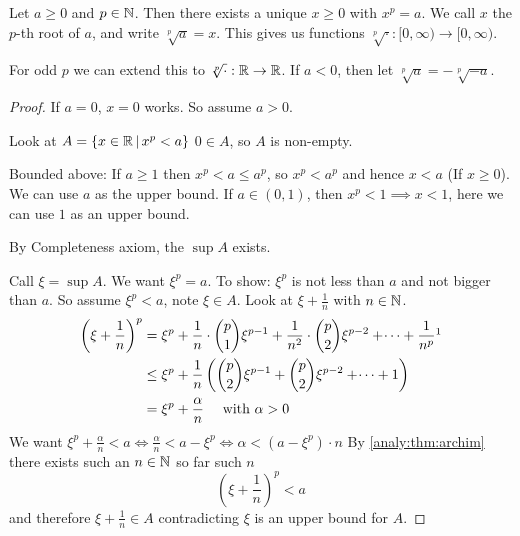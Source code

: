 \documentclass[10pt, a4paper]{article}
\begin{document}
\begin{theorem}
    Let $a \geq 0$ and $p \in \mathbb{N}$.
    Then there exists a unique $x \geq 0$ with $x ^ p = a$.
    We call $x$ the $p$-th root of $a$,
    and write $\sqrt[p]{a} = x$.
    This gives us functions $\sqrt[p]{\cdot} : [0, \infty) \rightarrow [0, \infty)$.

    For odd $p$ we can extend this to $\sqrt[p]{\cdot} : \mathbb{R} \rightarrow \mathbb{R}$.
    If $a < 0$, then let $\sqrt[p]{a} = -\sqrt[p]{-a}$.
    \begin{proof}
        If $a = 0$, $x = 0$ works.
        So assume $a > 0$.

        Look at $A = \{x \in \mathbb{R}\,|\, x ^ p < a\}$
        $0 \in A$, so $A$ is non-empty.

        Bounded above: If $a \geq 1$ then $x ^ p < a \leq a ^ p$,
        so $x ^ p < a ^ p$ and hence $x < a$ (If $x \geq 0$). We can use $a$ as the upper bound.
        If $a \in (0, 1)$, then $x ^ p < 1 \implies x < 1$, here we can use $1$ as an upper bound.
        
        By Completeness axiom, the $\sup A$ exists. 
        
        Call $\xi = \sup A$.
        We want $\xi ^ p = a$.
        To show: $\xi ^ p$ is not less than $a$ and not bigger than $a$.
        So assume $\xi ^ p < a$, note $\xi \in A$.
        Look at $\xi + \frac{1}{n}$ with $n \in \mathbb{N}$.
        \begin{align*}
            \left(\xi + \frac{1}{n}\right) ^ p &= \xi ^ p + \frac{1}{n} \cdot \binom{p}{1} \xi ^ {p - 1} + \frac{1}{n ^ 2} \cdot \binom{p}{2} \xi ^ {p - 2} + \dotsi + \frac{1}{n ^ p}\footnotemark \\
            &\leq \xi ^ p + \frac{1}{n}\left(\binom{p}{2}\xi ^ {p - 1} + \binom{p}{2}\xi ^ {p - 2} + \dotsi + 1\right) \\
            &= \xi ^ p + \frac{\alpha}{n}\quad\text{ with } \alpha > 0
        \end{align*}
        We want $\xi ^ p + \frac{\alpha}{n} < a \iff \frac{\alpha}{n} < a - \xi ^ p \iff \alpha < \left(a - \xi ^ p\right) \cdot n$ By \autoref{analy:thm:archim} there exists such an $n \in \mathbb{N}$
        so far such $n$
        \[
        \left(\xi + \frac{1}{n}\right) ^ p < a
        \]
        and therefore $\xi + \frac{1}{n} \in A$ contradicting $\xi$ is an upper bound for $A$.


\end{proof}
\end{theorem}
\end{document}
